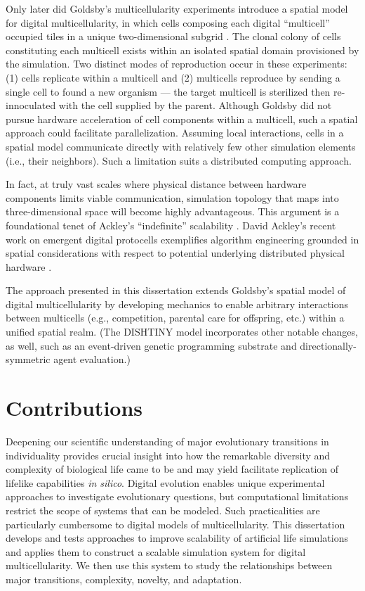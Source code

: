 Only later did Goldsby's multicellularity experiments introduce a spatial model for digital multicellularity, in which cells composing each digital ``multicell'' occupied tiles in a unique two-dimensional subgrid \citep{goldsby2014evolutionary}.
The clonal colony of cells constituting each multicell exists within an isolated spatial domain provisioned by the simulation.
Two distinct modes of reproduction occur in these experiments:
(1) cells replicate within a multicell and
(2) multicells reproduce by sending a single cell to found a new organism --- the target multicell is sterilized then re-innoculated with the cell supplied by the parent.
Although Goldsby did not pursue hardware acceleration of cell components within a multicell, such a spatial approach could facilitate parallelization.
Assuming local interactions, cells in a spatial model communicate directly with relatively few other simulation elements (i.e., their neighbors).
Such a limitation suits a distributed computing approach.

In fact, at truly vast scales where physical distance between hardware components limits viable communication, simulation topology that maps into three-dimensional space will become highly advantageous.
This argument is a foundational tenet of Ackley's ``indefinite'' scalability \citep{ackley2011pursue}.
David Ackley's recent work on emergent digital protocells exemplifies algorithm engineering grounded in spatial considerations with respect to potential underlying distributed physical hardware \citep{ackley2018digital,ackley2019building}.

The approach presented in this dissertation extends Goldsby's spatial model of digital multicellularity by developing mechanics to enable arbitrary interactions between multicells (e.g., competition, parental care for offspring, etc.) within a unified spatial realm.
(The DISHTINY model incorporates other notable changes, as well, such as an event-driven genetic programming substrate and directionally-symmetric agent evaluation.)

\section{Contributions}

Deepening our scientific understanding of major evolutionary transitions in individuality provides crucial insight into how the remarkable diversity and complexity of biological life came to be and may yield facilitate replication of lifelike capabilities \textit{in silico}.
Digital evolution enables unique experimental approaches to investigate evolutionary questions, but computational limitations restrict the scope of systems that can be modeled.
Such practicalities are particularly cumbersome to digital models of multicellularity.
This dissertation develops and tests approaches to improve scalability of artificial life simulations and applies them to construct a scalable simulation system for digital multicellularity.
We then use this system to study the relationships between major transitions, complexity, novelty, and adaptation.


